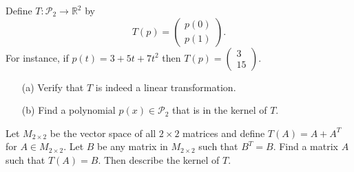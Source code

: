 \begin{problem}
    Define $T: \mathcal{P}_2 \to \mathbb{R}^2$ by 
    \[ T(p) = \begin{pmatrix} p(0) \\ p(1) \end{pmatrix}. \]
    For instance, if $p(t) = 3 + 5t + 7t^2$ then $T(p) = \begin{pmatrix} 3 \\ 15
    \end{pmatrix}$.
    \begin{enumerate}
        \item[(a)] Verify that $T$ is indeed a linear transformation.
        \item[(b)] Find a polynomial $p(x) \in \mathcal{P}_2$ that is in the kernel of $T$.
    \end{enumerate}
\end{problem}

\begin{problem}
    Let $M_{2\times2}$ be the vector space of all $2 \times 2$ matrices and define $T(A) =
    A + A^T$ for $A \in M_{2 \times 2}$.  Let $B$ be any matrix in $M_{2\times2}$ such
    that $B^T = B$.  Find a matrix $A$ such that $T(A) = B$.  Then describe the kernel of
    $T$.
\end{problem}


